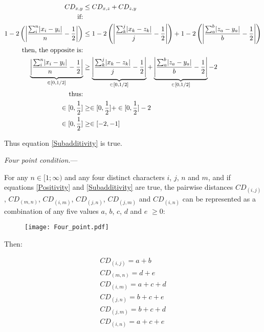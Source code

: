 \documentclass[12pt,letterpaper]{article}
\DeclarePairedDelimiter\abs{\lvert}{\rvert}%
\renewcommand{\subsection}[1]{%
\bigskip
\begin{center}
\begin{large}
\normalfont\itshape #1
\end{large}
\end{center}}
\renewcommand{\subsection}[1]{%
\vspace{2ex}
\noindent
\textit{#1.}---}
\begin{document}
\begin{equation}
    \label{subadditivity_demo}
    \begin{aligned}
    CD_{x,y} &\leq CD_{x,z} + CD_{z,y}\\
    \text{if:}\\
     1 - 2\left(\abs*{\frac{\sum_{i}^{n}\abs{x_{i}-y_{i}}}{n}-\frac{1}{2}}\right)
     &\leq 
     1 - 2\left(\abs*{\frac{\sum_{k}^{j}\abs{x_{k}-z_{k}}}{j}-\frac{1}{2}}\right) 
     +
     1 - 2\left(\abs*{\frac{\sum_{a}^{b}\abs{z_{a}-y_{a}}}{b}-\frac{1}{2}}\right) \\
     \text{then, the opposite is:}\\
     \underbrace{\abs*{\frac{\sum_{i}^{n}\abs{x_{i}-y_{i}}}{n}-\frac{1}{2}} }_{\in[0,1/2]}
     &\geq 
     \underbrace{\abs*{\frac{\sum_{k}^{j}\abs{x_{k}-z_{k}}}{j}-\frac{1}{2}} }_{\in[0,1/2]}
     +
     \underbrace{\abs*{\frac{\sum_{a}^{b}\abs{z_{a}-y_{a}}}{b}-\frac{1}{2}} }_{\in[0,1/2]} - 2\\
     \text{thus:}\\
     \in[0,\frac{1}{2}] &\geq \in[0,\frac{1}{2}] + \in[0,\frac{1}{2}] -2 \\
     \in[0,\frac{1}{2}] &\geq \in[-2,-1]\\
    \end{aligned}
\end{equation}

Thus equation \ref{Subadditivity} is true.


\newpage

\subsection{Four point condition}

For any $n \in [1;\infty)$ and any four distinct characters $i$, $j$, $n$ and $m$, and if equations \ref{Positivity} and \ref{Subadditivity} are true, the pairwise distances $CD_{(i,j)}$, $CD_{(m,n)}$, $CD_{(i,m)}$, $CD_{(j,n)}$, $CD_{(j,m)}$ and $CD_{(i,n)}$ can be represented as a combination of any five values $a$, $b$, $c$, $d$ and $e$ $\geq 0$:

\begin{figure}[!htbp]
\centering
   \texttt{[image: Four\_point.pdf]}
\end{figure}

Then:

\begin{equation}
    \begin{aligned}
    CD_{(i,j)} = a + b \\
    CD_{(m,n)} = d + e \\
    CD_{(i,m)} = a + c + d \\
    CD_{(j,n)} = b + c + e \\
    CD_{(j,m)} = b + c + d \\
    CD_{(i,n)} = a + c + e \\
    \end{aligned}
\end{equation}
\end{document}

